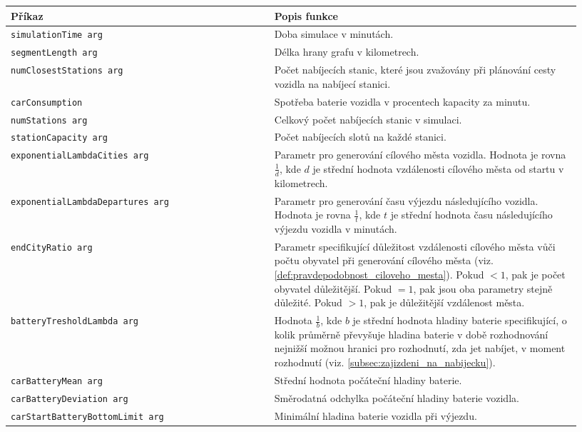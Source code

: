 \begin{table}
\centering\footnotesize\sf
\begin{tabular}{p{0.43\linewidth} p{0.5\linewidth}}
\toprule
Příkaz & Popis funkce \\
\midrule
\texttt{simulationTime arg} & Doba simulace v minutách. \\
\texttt{segmentLength arg} & Délka hrany grafu v kilometrech. \\
\texttt{numClosestStations arg} & Počet nabíjecích stanic, které jsou zvažovány 
    při plánování cesty vozidla na nabíjecí stanici. \\
\texttt{carConsumption} & Spotřeba baterie vozidla v procentech kapacity za minutu. \\
\texttt{numStations arg} & Celkový počet nabíjecích stanic v simulaci. \\
\texttt{stationCapacity arg} & Počet nabíjecích slotů na každé stanici. \\
\texttt{exponentialLambdaCities arg} & Parametr pro generování cílového města vozidla.
    Hodnota je rovna $\frac{1}{d}$, kde $d$ je střední hodnota vzdálenosti 
    cílového města od startu v kilometrech. \\
\texttt{exponentialLambdaDepartures arg} & Parametr pro generování času výjezdu
    následujícího vozidla. Hodnota je rovna $\frac{1}{t}$, kde $t$ je střední 
    hodnota času následujícího výjezdu vozidla v minutách. \\
\texttt{endCityRatio arg} & Parametr specifikující důležitost vzdálenosti cílového
    města vůči počtu obyvatel při generování cílového města 
    (viz. \cref{def:pravdepodobnost_ciloveho_mesta}). Pokud $<1$, pak je
    počet obyvatel důležitější. Pokud $=1$, pak jsou oba parametry stejně důležité.
    Pokud $>1$, pak je důležitější vzdálenost města. \\
\texttt{batteryTresholdLambda arg} & Hodnota $\frac{1}{b}$, kde $b$ je střední 
    hodnota hladiny baterie specifikující, o kolik průměrně převyšuje hladina baterie v době
    rozhodnování nejnižší možnou hranici pro rozhodnutí, zda jet nabíjet, v moment rozhodnutí
    (viz. \cref{subsec:zajizdeni_na_nabijecku}). \\
\texttt{carBatteryMean arg} & Střední hodnota počáteční hladiny baterie. \\
\texttt{carBatteryDeviation arg} & Směrodatná odchylka počáteční hladiny baterie vozidla. \\
\texttt{carStartBatteryBottomLimit arg} & Minimální hladina baterie vozidla při výjezdu. \\

\end{tabular}
\end{table}
